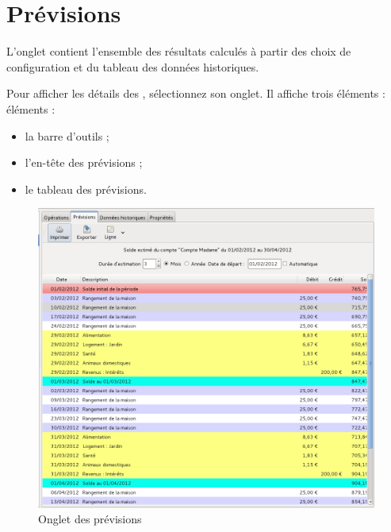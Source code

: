 \section{Prévisions\label{budget-estimate}}


L'onglet  contient l'ensemble des résultats calculés à partir des choix de configuration et du tableau des données historiques.

Pour afficher les détails des , sélectionnez son onglet. Il affiche trois \ifIllustration éléments :
\else éléments : 
\fi

\begin{itemize}
	\item la barre d'outils ;
	\item l'en-tête des prévisions ; 
	\item le tableau des prévisions.
\end{itemize}

\ifIllustration
\begin{figure}[t]
\begin{center}
\includegraphics[scale=0.49]{image/screenshot/budget_estimate}
\end{center}
\caption{Onglet des prévisions}
\label{budget-estimate-img}
\end{figure}
\fi

\ifIllustration
\else
\newpage
\fi

